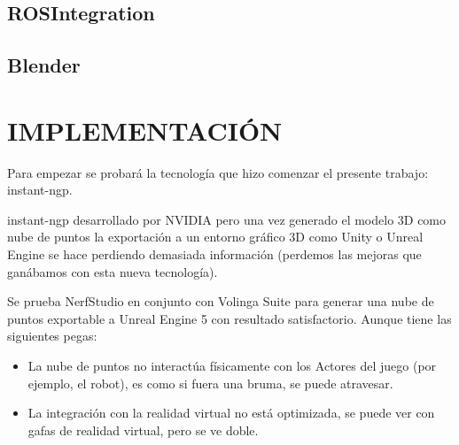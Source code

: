 \documentclass[a4paper, 12pt, spanish, twoside]{article}
\begin{document}
\subsection{ROSIntegration} \label{sec:herramientas:rosintegration}


\subsection{Blender} \label{sec:herramientas:blender}


\clearpage





\newpage
\section{IMPLEMENTACIÓN} \label{sec:implementacion}





Para empezar se probará la tecnología que hizo comenzar el presente trabajo: \gls{instant-ngp}.

\gls{instant-ngp} desarrollado por NVIDIA pero una vez generado el modelo 3D como nube de puntos la exportación a un entorno gráfico 3D como Unity o Unreal Engine se hace perdiendo demasiada información (perdemos las mejoras que ganábamos con esta nueva tecnología).

Se prueba NerfStudio en conjunto con Volinga Suite para generar una nube de puntos exportable a Unreal Engine 5 con resultado satisfactorio. Aunque tiene las siguientes pegas:

\begin{itemize}
\item La nube de puntos no interactúa físicamente con los Actores del juego (por ejemplo, el robot), es como si fuera una bruma, se puede atravesar.

\item La integración con la realidad virtual no está optimizada, se puede ver con gafas de realidad virtual, pero se ve doble.
\end{itemize}
\end{document}
